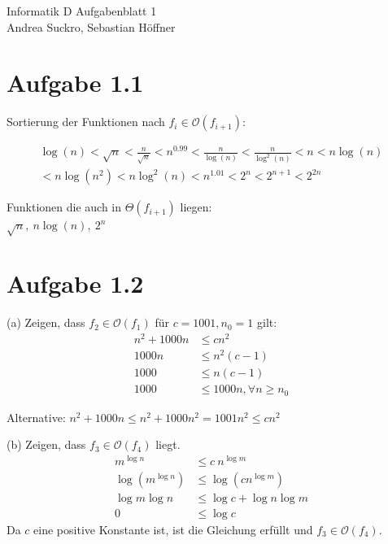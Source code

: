 \documentclass{article}
\begin{document}
\begin{center}
\LARGE Informatik D Aufgabenblatt 1\\
\small Andrea Suckro, Sebastian Höffner
\end{center}
\vspace{0.3cm}
\normalsize

\section*{Aufgabe 1.1}

Sortierung der Funktionen nach $f_i\in\mathcal{O}(f_{i+1})$:

\begin{align*}
  \log(n) 
< \sqrt{n}
< \frac{n}{\sqrt{n}}
< n^{0.99}
< \frac{n}{\log(n)}
< \frac{n}{\log^2(n)}
< n                   
< n\log(n) \\
< n\log(n^2)
< n\log^2(n)           
< n^{1.01}
< 2^n 
< 2^{n+1}
< 2^{2n}
\end{align*}

\noindent Funktionen die auch in $\Theta(f_{i+1})$ liegen:\\ %
$\sqrt{n},\ n \log(n),\ 2^n$

\section*{Aufgabe 1.2}

(a) Zeigen, dass $f_2 \in \mathcal{O}(f_1)$ f\"ur $c=1001,n_0=1$ gilt:
\begin{align*}
n^2+1000n &\leq cn^2 \\
1000n &\leq n^2(c - 1)\\
1000 &\leq n(c-1)\\
1000 &\leq 1000n, \forall n\geq n_0
\end{align*}

Alternative: $n^2+1000n\leq n^2+1000n^2 = 1001 n^2 \leq cn^2$

\noindent (b) Zeigen, dass $f_3 \in \mathcal{O}(f_4)$ liegt.
\begin{align*}
     m^{\log n}  &\leq      c\ n^{\log m}      \\
\log{\left(m^{\log n}\right)} &\leq \log{\left(c  n^{\log m}\right)}     \\
\log m  \log n   &\leq \log c  + \log n \log m \\
             0   &\leq \log c                    
\end{align*}
\noindent Da $c$ eine positive Konstante ist, ist die Gleichung erf\"ullt und $f_3 \in \mathcal{O}(f_4)$.
\end{document}
